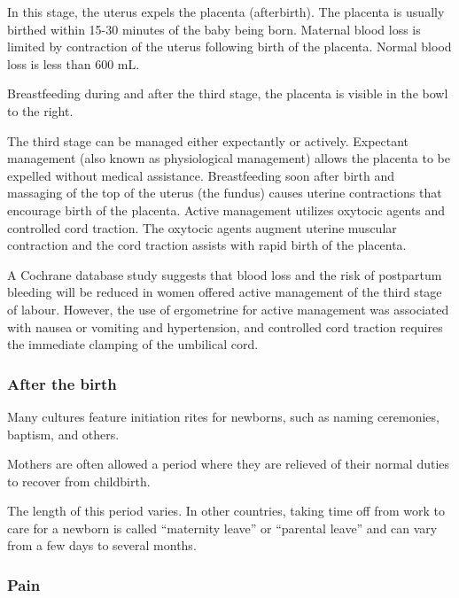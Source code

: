 \documentclass[12pt,a4paper,onecolumn]{article}
\begin{document}
\begin{figwindow}
In this stage, the uterus expels the placenta (afterbirth). The placenta is usually birthed within
15-30 minutes of the baby being born. Maternal blood loss is limited by contraction of the uterus
following birth of the placenta. Normal blood loss is less than 600 mL.

Breastfeeding during and after the third stage, the placenta is visible in the bowl to the right.

The third stage can be managed either expectantly or actively. Expectant management (also known as
physiological management) allows the placenta to be expelled without medical assistance.
Breastfeeding soon after birth and massaging of the top of the uterus (the fundus) causes uterine
contractions that encourage birth of the placenta. Active management utilizes oxytocic agents and
controlled cord traction. The oxytocic agents augment uterine muscular contraction and the cord
traction assists with rapid birth of the placenta.
\end{figwindow}

A Cochrane database study suggests that blood loss and the risk of postpartum bleeding will be
reduced in women offered active management of the third stage of labour. However, the use of
ergometrine for active management was associated with nausea or vomiting and hypertension, and
controlled cord traction requires the immediate clamping of the umbilical cord.

\subsubsection{After the birth}

Many cultures feature initiation rites for newborns, such as naming ceremonies, baptism, and others.

Mothers are often allowed a period where they are relieved of their normal duties to recover from
childbirth. 

The length of this period varies. In other countries, taking time off from work to care for a
newborn is called ``maternity leave'' or ``parental leave'' and can vary from a few days to several
months.

\subsubsection{Pain}
\end{document}

